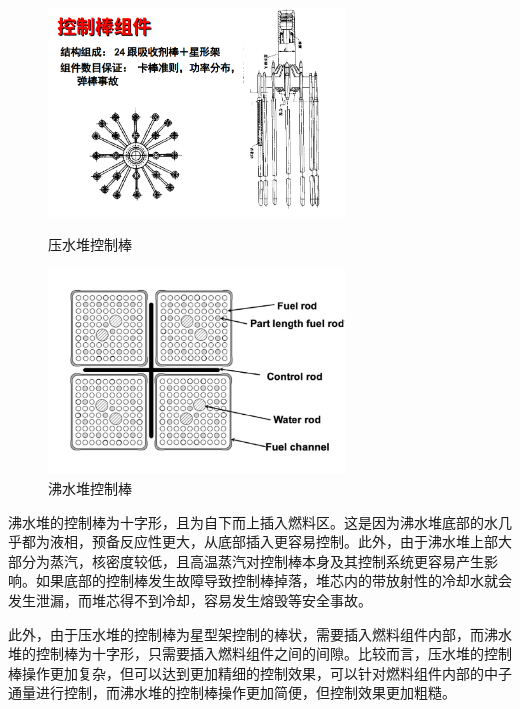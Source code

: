 \documentclass{article}
\begin{document}
\begin{figure}[htbp]
    \centering
    \begin{minipage}{0.45\textwidth}
        \centering
        \includegraphics[width=0.7\textwidth]{figures/PWR-control-rod.png}
        \caption{压水堆控制棒}
        \label{fig:PWR-control-rod}
    \end{minipage}
    \hfill
    \begin{minipage}{0.45\textwidth}
        \centering
        \includegraphics[width=0.7\textwidth]{figures/BWR-control-rod.png}
        \caption{沸水堆控制棒}
        \label{fig:BWR-control-rod}
    \end{minipage}
\end{figure}

沸水堆的控制棒为十字形，且为自下而上插入燃料区。这是因为沸水堆底部的水几乎都为液相，预备反应性更大，从底部插入更容易控制。此外，由于沸水堆上部大部分为蒸汽，核密度较低，且高温蒸汽对控制棒本身及其控制系统更容易产生影响。如果底部的控制棒发生故障导致控制棒掉落，堆芯内的带放射性的冷却水就会发生泄漏，而堆芯得不到冷却，容易发生熔毁等安全事故。

此外，由于压水堆的控制棒为星型架控制的棒状，需要插入燃料组件内部，而沸水堆的控制棒为十字形，只需要插入燃料组件之间的间隙。比较而言，压水堆的控制棒操作更加复杂，但可以达到更加精细的控制效果，可以针对燃料组件内部的中子通量进行控制，而沸水堆的控制棒操作更加简便，但控制效果更加粗糙。
\end{document}
